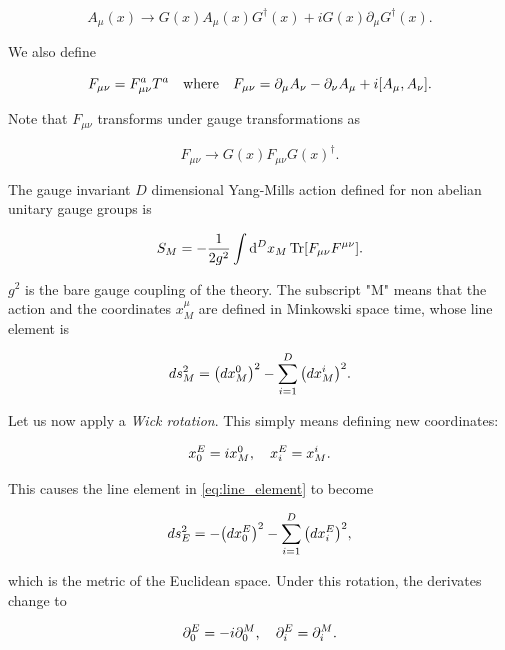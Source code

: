 \documentclass[reqno,12pt]{article}
\numberwithin{equation}{section}
\begin{document}
\begin{equation} \label{eq:A_mu_gauge_trans}
	A_\mu(x) \rightarrow G(x) A_\mu(x) G^\dagger(x) + i G(x) \partial_\mu G^\dagger(x).
\end{equation}

We also define

\begin{equation}
	F_{\mu\nu} = F_{\mu\nu}^a T^a \qq{where} 
	F_{\mu\nu} = \partial_\mu A_\nu - \partial_\nu A_\mu + i \qty[A_\mu, A_\nu].
\end{equation}

Note that $F_{\mu\nu}$ transforms under gauge transformations as

\begin{equation}
	F_{\mu\nu} \rightarrow G(x) F_{\mu\nu} G(x)^\dagger.
\end{equation}

The gauge invariant $D$ dimensional Yang-Mills action 
defined for non abelian unitary gauge groups is

\begin{equation} \label{eq:ym_action_mink}
	S_M = -\frac{1}{2g^2} \int \dd[D]{x_M} \Tr[F_{\mu\nu}F^{\mu\nu}].
\end{equation}

$g^2$ is the bare gauge coupling of the theory. The subscript "M" means that the action and the coordinates $x_M^\mu$ are defined
in Minkowski space time, whose line element is

\begin{equation} \label{eq:line_element}
	ds_M^2 = \qty(dx_M^0)^2 - \sum_{i=1}^D \qty(dx_M^i)^2.
\end{equation}

Let us now apply a \textit{Wick rotation}. This simply means defining new coordinates:

\begin{equation} \label{eq:wick_rotation}
	x_0^E = i x^0_M \qc x_i^E = x_M^i.
\end{equation}

This causes the line element in \eqref{eq:line_element} to become

\begin{equation}
	ds_E^2 = -\qty(dx^E_0)^2 - \sum_{i=1}^D \qty(dx^E_i)^2,
\end{equation}

which is the metric of the Euclidean space. Under this rotation, the derivates change to

\begin{equation}
	\partial_0^E = -i \partial_0^M \qc \partial_i^E = \partial_i^M.
\end{equation}
\end{document}
